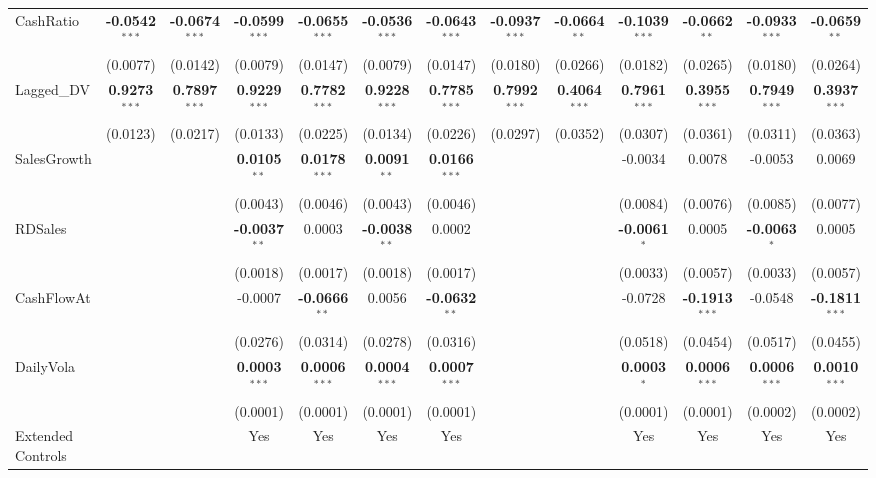 \documentclass[11pt,a4paper]{article}
\begin{document}
\begin{table}[htbp]
\begin{tabular}{lcccccccccccc}
CashRatio & \textbf{-0.0542}$^{***}$ & \textbf{-0.0674}$^{***}$ & \textbf{-0.0599}$^{***}$ & \textbf{-0.0655}$^{***}$ & \textbf{-0.0536}$^{***}$ & \textbf{-0.0643}$^{***}$ & \textbf{-0.0937}$^{***}$ & \textbf{-0.0664}$^{**}$ & \textbf{-0.1039}$^{***}$ & \textbf{-0.0662}$^{**}$ & \textbf{-0.0933}$^{***}$ & \textbf{-0.0659}$^{**}$ \\
 & (0.0077) & (0.0142) & (0.0079) & (0.0147) & (0.0079) & (0.0147) & (0.0180) & (0.0266) & (0.0182) & (0.0265) & (0.0180) & (0.0264) \\
Lagged\_DV & \textbf{0.9273}$^{***}$ & \textbf{0.7897}$^{***}$ & \textbf{0.9229}$^{***}$ & \textbf{0.7782}$^{***}$ & \textbf{0.9228}$^{***}$ & \textbf{0.7785}$^{***}$ & \textbf{0.7992}$^{***}$ & \textbf{0.4064}$^{***}$ & \textbf{0.7961}$^{***}$ & \textbf{0.3955}$^{***}$ & \textbf{0.7949}$^{***}$ & \textbf{0.3937}$^{***}$ \\
 & (0.0123) & (0.0217) & (0.0133) & (0.0225) & (0.0134) & (0.0226) & (0.0297) & (0.0352) & (0.0307) & (0.0361) & (0.0311) & (0.0363) \\
SalesGrowth &  &  & \textbf{0.0105}$^{**}$ & \textbf{0.0178}$^{***}$ & \textbf{0.0091}$^{**}$ & \textbf{0.0166}$^{***}$ &  &  & -0.0034 & 0.0078 & -0.0053 & 0.0069 \\
 &  &  & (0.0043) & (0.0046) & (0.0043) & (0.0046) &  &  & (0.0084) & (0.0076) & (0.0085) & (0.0077) \\
RDSales &  &  & \textbf{-0.0037}$^{**}$ & 0.0003 & \textbf{-0.0038}$^{**}$ & 0.0002 &  &  & \textbf{-0.0061}$^{*}$ & 0.0005 & \textbf{-0.0063}$^{*}$ & 0.0005 \\
 &  &  & (0.0018) & (0.0017) & (0.0018) & (0.0017) &  &  & (0.0033) & (0.0057) & (0.0033) & (0.0057) \\
CashFlowAt &  &  & -0.0007 & \textbf{-0.0666}$^{**}$ & 0.0056 & \textbf{-0.0632}$^{**}$ &  &  & -0.0728 & \textbf{-0.1913}$^{***}$ & -0.0548 & \textbf{-0.1811}$^{***}$ \\
 &  &  & (0.0276) & (0.0314) & (0.0278) & (0.0316) &  &  & (0.0518) & (0.0454) & (0.0517) & (0.0455) \\
DailyVola &  &  & \textbf{0.0003}$^{***}$ & \textbf{0.0006}$^{***}$ & \textbf{0.0004}$^{***}$ & \textbf{0.0007}$^{***}$ &  &  & \textbf{0.0003}$^{*}$ & \textbf{0.0006}$^{***}$ & \textbf{0.0006}$^{***}$ & \textbf{0.0010}$^{***}$ \\
 &  &  & (0.0001) & (0.0001) & (0.0001) & (0.0001) &  &  & (0.0001) & (0.0001) & (0.0002) & (0.0002) \\
\midrule
Extended Controls &  &  & Yes & Yes & Yes & Yes &  &  & Yes & Yes & Yes & Yes \\

\end{tabular}
\end{table}
\end{document}
